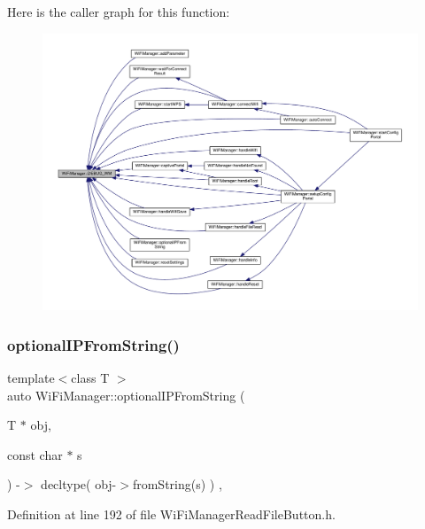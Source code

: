 Here is the caller graph for this function\+:
\nopagebreak
\begin{figure}[H]
\begin{center}
\leavevmode
\includegraphics[width=350pt]{d4/dc8/class_wi_fi_manager_ae5f595c670ccbcf9a191baf50f5c7c26_icgraph}
\end{center}
\end{figure}
\mbox{\label{class_wi_fi_manager_a6a94f08eb43e0871932556a4ccfa11b7}} 
\subsubsection{\texorpdfstring{optional\+I\+P\+From\+String()}{optionalIPFromString()}\hspace{0.1cm}{\footnotesize\ttfamily [1/2]}}
{\footnotesize\ttfamily template$<$class T $>$ \\
auto Wi\+Fi\+Manager\+::optional\+I\+P\+From\+String (\begin{DoxyParamCaption}\item[{T $\ast$}]{obj,  }\item[{const char $\ast$}]{s }\end{DoxyParamCaption}) -\/$>$ decltype(  obj-\/$>$from\+String(s)  ) \hspace{0.3cm}{\ttfamily [inline]}, {\ttfamily [private]}}



Definition at line 192 of file Wi\+Fi\+Manager\+Read\+File\+Button.\+h.



